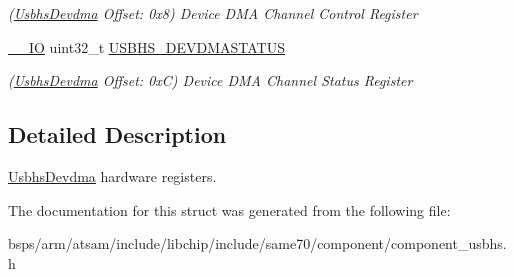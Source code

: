 \begin{DoxyCompactItemize}
\begin{DoxyCompactList}\small\item\em (\mbox{\hyperlink{structUsbhsDevdma}{Usbhs\+Devdma}} Offset\+: 0x8) Device D\+MA Channel Control Register \end{DoxyCompactList}\item 
\mbox{\label{structUsbhsDevdma_ae1b6c396eb4d5e6344cac5c45d3b737a}} 
\mbox{\hyperlink{core__cm7_8h_aec43007d9998a0a0e01faede4133d6be}{\+\_\+\+\_\+\+IO}} uint32\+\_\+t \mbox{\hyperlink{structUsbhsDevdma_ae1b6c396eb4d5e6344cac5c45d3b737a}{U\+S\+B\+H\+S\+\_\+\+D\+E\+V\+D\+M\+A\+S\+T\+A\+T\+US}}
\begin{DoxyCompactList}\small\item\em (\mbox{\hyperlink{structUsbhsDevdma}{Usbhs\+Devdma}} Offset\+: 0xC) Device D\+MA Channel Status Register \end{DoxyCompactList}\end{DoxyCompactItemize}


\subsection{Detailed Description}
\mbox{\hyperlink{structUsbhsDevdma}{Usbhs\+Devdma}} hardware registers. 

The documentation for this struct was generated from the following file\+:\begin{DoxyCompactItemize}
\item 
bsps/arm/atsam/include/libchip/include/same70/component/component\+\_\+usbhs.\+h\end{DoxyCompactItemize}
